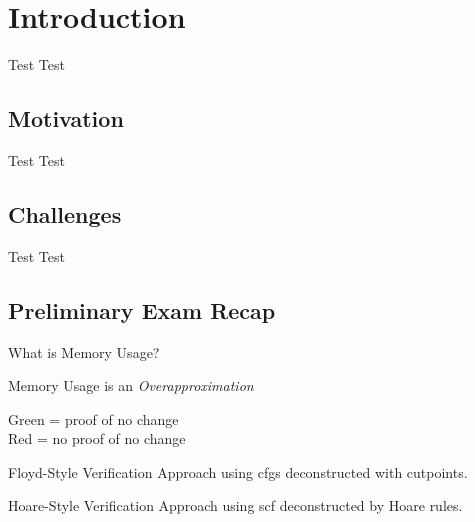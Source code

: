 \section{Introduction}
\begin{frame}{Test}
  Test
\end{frame}


\subsection{Motivation}
\begin{frame}{Test}
  Test
\end{frame}


\subsection{Challenges}
\begin{frame}{Test}
  Test
\end{frame}


\subsection{Preliminary Exam Recap}
\begin{frame}{What is Memory Usage?}
\end{frame}

\begin{frame}{Memory Usage is an \emph{Overapproximation}}
  \centering

  Green = proof of no change \\
  Red = no proof of no change
\end{frame}

\begin{frame}{Floyd-Style Verification}
  Approach using \glspl{cfg} deconstructed with \alert{cutpoints}.
\end{frame}

\begin{frame}{Hoare-Style Verification}
  Approach using \gls{scf} deconstructed by \alert{Hoare rules}.
\end{frame}
